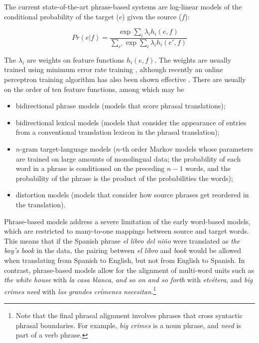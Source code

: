 \documentclass[11pt]{report}
\theoremstyle{plain}
\begin{document}
{The current state-of-the-art phrase-based systems are log-linear
models of the conditional probability of the target ($e$) given the
source ($f$):

\begin{equation}
Pr(e|f) = \frac{\exp{\sum_{i} \lambda_i h_i(e,f)}}{\sum_{e'} \exp{\sum_{i} \lambda_i h_i(e',f)}}
\label{loglinear}
\end{equation}

\noindent
The $\lambda_i$ are weights on feature functions $h_i(e,f)$. The
weights are usually trained using minimum error rate training
, although recently an online perceptron training
algorithm has also been shown effective . There are
usually on the order of ten feature functions, among which may be

\begin{itemize}
\item bidirectional phrase models (models that score phrasal translations);
\item bidirectional lexical models (models that consider the
appearance of entries from a conventional translation lexicon in the
phrasal translation);
\item $n$-gram target-language models ($n$-th order Markov models
whose parameters are trained on large amounts of monolingual data; the
probability of each word in a phrase is conditioned on the preceding
$n-1$ words, and the probability of the phrase is the product of the
probabilities the words);
\item distortion models (models that consider how source phrases get
reordered in the translation).
\end{itemize}

Phrase-based models address a severe limitation of the early
word-based models, which are restricted to many-to-one mappings
between source and target words. This means that if the Spanish phrase
{\em el libro del ni\~{n}o} were translated as {\em the boy's book} in
the data, the pairing between {\em el libro} and {\em book} would be
allowed when translating from Spanish to English, but not from English
to Spanish. In contrast, phrase-based models allow for the alignment
of multi-word units such as {\em the white house} with {\em la casa
blanca}, {\em and so on and so forth} with {\em etc\'{e}tera}, and
{\em big crimes need} with {\em los grandes cr\'{i}menes
necesitan}.\footnote{Note that the final phrasal alignment involves
phrases that cross syntactic phrasal boundaries. For example, {\em big
crimes} is a noun phrase, and {\em need} is part of a verb phrase.}

}
\end{document}
